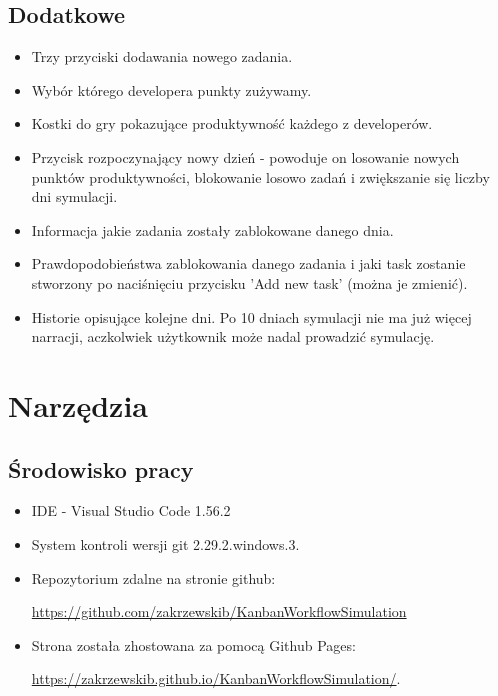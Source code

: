 \documentclass{article}
\begin{document}
\subsection{Dodatkowe}
\begin{itemize}
    \item Trzy przyciski dodawania nowego zadania.
    \item Wybór którego developera punkty zużywamy.
    \item Kostki do gry pokazujące produktywność każdego z developerów.
    \item Przycisk rozpoczynający nowy dzień - powoduje on losowanie nowych punktów produktywności, blokowanie losowo zadań i zwiększanie się liczby dni symulacji.
    \item Informacja jakie zadania zostały zablokowane danego dnia.
    \item Prawdopodobieństwa zablokowania danego zadania i jaki task zostanie stworzony po naciśnięciu przycisku 'Add new task' (można je zmienić).
    \item Historie opisujące kolejne dni. Po 10 dniach symulacji nie ma już więcej narracji, aczkolwiek użytkownik może nadal prowadzić symulację. 
\end{itemize}

\section{Narzędzia}

\subsection{Środowisko pracy}
\begin{itemize}
    \item IDE - Visual Studio Code 1.56.2
    \item System kontroli wersji git 2.29.2.windows.3.
    \item Repozytorium zdalne na stronie github:
    
    \href{https://github.com/zakrzewskib/KanbanWorkflowSimulation}{https://github.com/zakrzewskib/KanbanWorkflowSimulation}
    
    \item Strona została zhostowana za pomocą Github Pages:
    
    \href{https://zakrzewskib.github.io/KanbanWorkflowSimulation/}{https://zakrzewskib.github.io/KanbanWorkflowSimulation/}.
    
\end{itemize}
\end{document}
